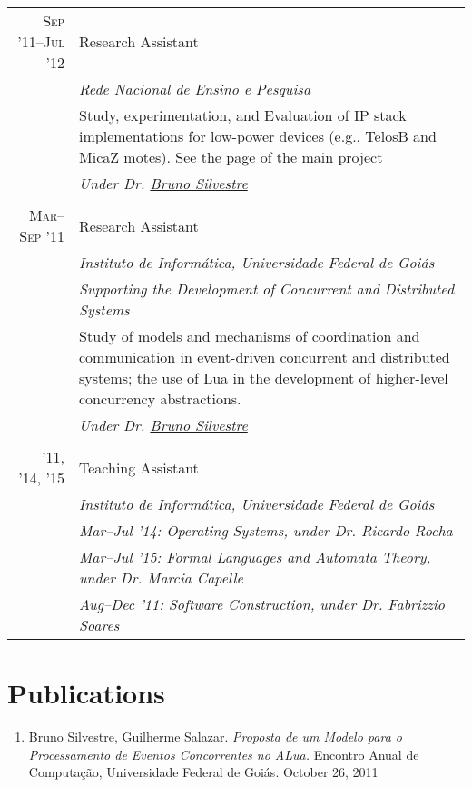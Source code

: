 \documentclass[a4paper,10pt]{article}
\begin{document}
\begin{longtable}{r|p{11cm}}
  \textsc{Sep '11--Jul '12}
  & Research Assistant \\
  &\emph{Rede Nacional de Ensino e Pesquisa}\\
  &\footnotesize{Study, experimentation, and Evaluation of IP stack implementations 
  for low-power devices (e.g., TelosB and MicaZ motes). See 
            \href{http://www.nr2.ufpr.br/cia2/}{the page} of the main project}\\
  &\emph{Under Dr. \href{http://inf.ufg.br/~brunoos/}{Bruno Silvestre}}
  \\\multicolumn{2}{c}{} \\

  \textsc{Mar--Sep '11}
  & Research Assistant \\
  &\emph{Instituto de Informática, Universidade Federal de Goiás}\\
  &\emph{Supporting the Development of Concurrent and Distributed Systems}\\
  &\indent \footnotesize{Study of models and mechanisms of coordination and 
        communication in event-driven concurrent and distributed systems; the 
        use of Lua in the development of higher-level concurrency abstractions.}\\
  &\emph{Under Dr. \href{http://inf.ufg.br/~brunoos/}{Bruno Silvestre}}
  \\\multicolumn{2}{c}{} \\

  \textsc{'11, '14, '15}
  & Teaching Assistant \\
  &\emph{Instituto de Informática, Universidade Federal de Goiás} \\
  &\emph{Mar--Jul '14: \footnotesize{Operating Systems,
                       under Dr. Ricardo Rocha}} \\
  &\emph{Mar--Jul '15: \footnotesize{Formal Languages and Automata Theory,
                       under Dr. Marcia Capelle}} \\
  &\emph{Aug--Dec '11: \footnotesize{Software Construction,
                       under Dr. Fabrizzio Soares}}
\end{longtable}

\section{Publications}
\begin{enumerate}
  \renewcommand{\labelenumi}{[\arabic{enumi}] }
  \item Bruno Silvestre, Guilherme Salazar. \emph{Proposta de um Modelo para o
        Processamento de Eventos Concorrentes no ALua.} Encontro Anual de
        Computação, Universidade Federal de Goiás. October 26, 2011
\end{enumerate}
\end{document}
